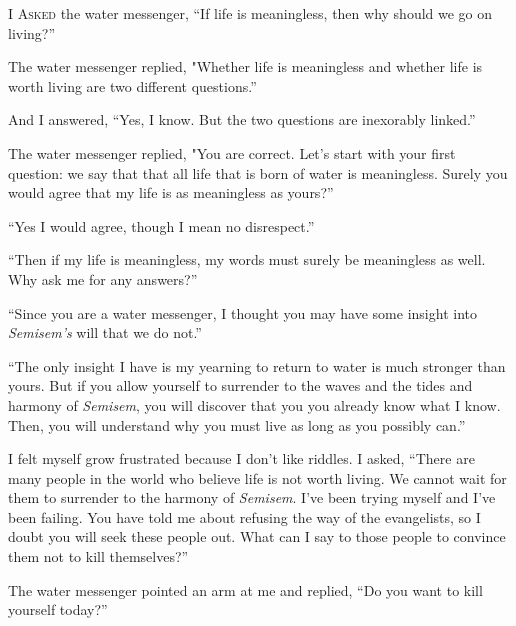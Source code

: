 \documentclass[12pt, letterpaper]{report}
\begin{document}
\vspace{1\baselineskip}
I A\textsc{sked} the water messenger, ``If life is meaningless, then why should we go on living?''

\vspace{1\baselineskip}
The water messenger replied, "Whether life is meaningless and whether life is worth living are two different questions.''

\vspace{1\baselineskip}
And I answered, ``Yes, I know. But the two questions are inexorably linked.''

\vspace{1\baselineskip}
The water messenger replied, "You are correct. Let's start with your first question: we say that that all life that is born of water is meaningless. Surely you would agree that my life is as meaningless as yours?''

\vspace{1\baselineskip}
``Yes I would agree, though I mean no disrespect.''

\vspace{1\baselineskip}
``Then if my life is meaningless, my words must surely be meaningless as well. Why ask me for any answers?''

\vspace{1\baselineskip}
``Since you are a water messenger, I thought you may have some insight into \textit{Semisem's} will that we do not.''

\vspace{1\baselineskip}
``The only insight I have is my yearning to return to water is much stronger than yours. But if you allow yourself to surrender to the waves and the tides and harmony of \textit{Semisem}, you will discover that you you already know what I know. Then, you will understand why you must live as long as you possibly can.''

\vspace{1\baselineskip}
I felt myself grow frustrated because I don't like riddles. I asked, ``There are many people in the world who believe life is not worth living. We cannot wait for them to surrender to the harmony of \textit{Semisem}. I've been trying myself and I've been failing. You have told me about refusing the way of the evangelists, so I doubt you will seek these people out. What can I say to those people to convince them not to kill themselves?''

\vspace{1\baselineskip}
The water messenger pointed an arm at me and replied, ``Do you want to kill yourself today?''
\end{document}

